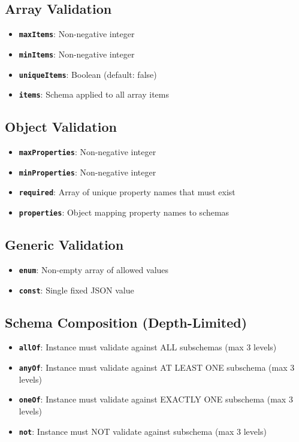 \subsection{Array Validation}

\begin{itemize}
  \item \textbf{\texttt{maxItems}}: Non-negative integer
  \item \textbf{\texttt{minItems}}: Non-negative integer
  \item \textbf{\texttt{uniqueItems}}: Boolean (default: false)
  \item \textbf{\texttt{items}}: Schema applied to all array items
\end{itemize}

\subsection{Object Validation}

\begin{itemize}
  \item \textbf{\texttt{maxProperties}}: Non-negative integer
  \item \textbf{\texttt{minProperties}}: Non-negative integer
  \item \textbf{\texttt{required}}: Array of unique property names that must exist
  \item \textbf{\texttt{properties}}: Object mapping property names to schemas
\end{itemize}

\subsection{Generic Validation}

\begin{itemize}
  \item \textbf{\texttt{enum}}: Non-empty array of allowed values
  \item \textbf{\texttt{const}}: Single fixed JSON value
\end{itemize}

\subsection{Schema Composition (Depth-Limited)}

\begin{itemize}
  \item \textbf{\texttt{allOf}}: Instance must validate against ALL subschemas (max 3 levels)
  \item \textbf{\texttt{anyOf}}: Instance must validate against AT LEAST ONE subschema (max 3 levels)
  \item \textbf{\texttt{oneOf}}: Instance must validate against EXACTLY ONE subschema (max 3 levels)
  \item \textbf{\texttt{not}}: Instance must NOT validate against subschema (max 3 levels)
\end{itemize}


